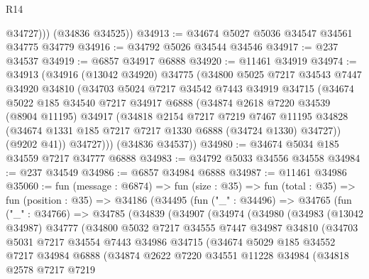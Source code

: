 \begin{lexlean}{R14}
\begin{coremodule}
            @34727)))
      (@34836 @34525))
@34913 := @34674 @5027 @5036 @34547 @34561 @34775 @34779
@34916 := @34792 @5026 @34544 @34546
@34917 := @237 @34537
@34919 := @6857 @34917 @6888
@34920 := @11461 @34919
@34974 := @34913
    (@34916
      (@13042 @34920)
      @34775
      (@34800
        @5025
        @7217
        @34543
        @7447
        @34920
        @34810
        (@34703
          @5024
          @7217
          @34542
          @7443
          @34919
          @34715
          (@34674
            @5022
            @185
            @34540
            @7217
            @34917
            @6888
            (@34874
              @2618
              @7220
              @34539
              (@8904 @11195)
              @34917
              (@34818
                @2154
                @7217
                @7219
                @7467
                @11195
                @34828
                (@34674 @1331 @185 @7217 @7217 @1330 @6888 (@34724 @1330) @34727))
              (@9202 @41))
            @34727)))
      (@34836 @34537))
@34980 := @34674 @5034 @185 @34559 @7217 @34777 @6888
@34983 := @34792 @5033 @34556 @34558
@34984 := @237 @34549
@34986 := @6857 @34984 @6888
@34987 := @11461 @34986
@35060 := fun (message : @6874) =>
  fun (size : @35) =>
  fun (total : @35) =>
  fun (position : @35) =>
  @34186
    (@34495
      (fun ("_" : @34496) =>
      @34765
        (fun ("_" : @34766) =>
        @34785
          (@34839
            (@34907
              (@34974
                (@34980
                  (@34983
                    (@13042 @34987)
                    @34777
                    (@34800
                      @5032
                      @7217
                      @34555
                      @7447
                      @34987
                      @34810
                      (@34703
                        @5031
                        @7217
                        @34554
                        @7443
                        @34986
                        @34715
                        (@34674
                          @5029
                          @185
                          @34552
                          @7217
                          @34984
                          @6888
                          (@34874
                            @2622
                            @7220
                            @34551
                            @11228
                            @34984
                            (@34818
                              @2578
                              @7217
                              @7219

\end{coremodule}
\end{lexlean}
